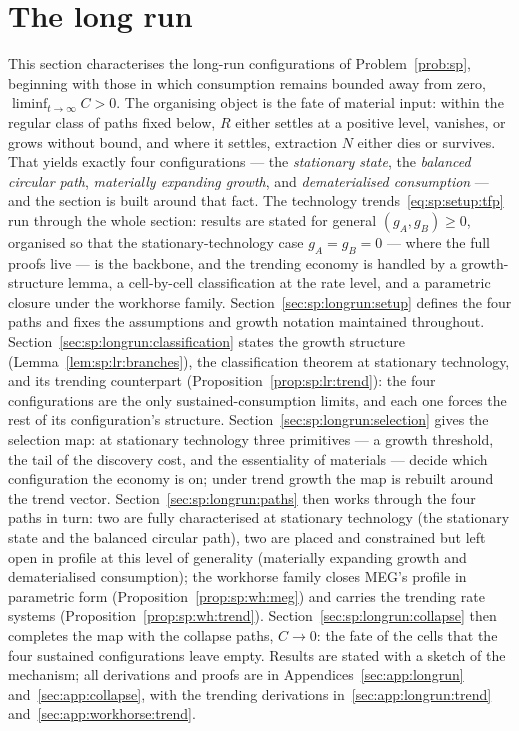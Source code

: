 \section{The long run}\label{sec:sp:longrun}

This section characterises the long-run configurations of Problem~\ref{prob:sp}, beginning
with those in which consumption remains bounded away from zero,
$\liminf_{t\to\infty}C>0$. The organising object is
the fate of material input: within the regular class of paths fixed below, $R$ either settles at
a positive level, vanishes, or grows without bound, and where it settles, extraction $N$ either
dies or survives. That yields exactly four configurations --- the \emph{stationary state}, the
\emph{balanced circular path}, \emph{materially expanding growth}, and \emph{dematerialised
consumption} --- and the section is built around that fact. The technology
trends~\eqref{eq:sp:setup:tfp} run through the whole section: results are stated for general
$\left(g_A,g_B\right)\ge0$, organised so that the stationary-technology case $g_A=g_B=0$ ---
where the full proofs live --- is the backbone, and the trending economy is handled by a
growth-structure lemma, a cell-by-cell classification at the rate level, and a parametric
closure under the workhorse family.
Section~\ref{sec:sp:longrun:setup} defines the four paths and fixes the assumptions and growth
notation maintained throughout. Section~\ref{sec:sp:longrun:classification} states the growth
structure (Lemma~\ref{lem:sp:lr:branches}), the classification theorem at stationary
technology, and its trending counterpart (Proposition~\ref{prop:sp:lr:trend}): the four
configurations are the only sustained-consumption limits, and each one forces the rest of its
configuration's structure.
Section~\ref{sec:sp:longrun:selection} gives the selection map: at stationary technology three
primitives --- a growth threshold, the tail of the discovery cost, and the essentiality of
materials --- decide which configuration the economy is on; under trend growth the map is
rebuilt around the trend vector. Section~\ref{sec:sp:longrun:paths} then works through the four
paths in turn: two are fully characterised at stationary technology (the stationary state and
the balanced circular path), two are placed and constrained but left open in profile at this
level of generality (materially expanding growth and dematerialised consumption); the
workhorse family closes MEG's profile in parametric form (Proposition~\ref{prop:sp:wh:meg})
and carries the trending rate systems (Proposition~\ref{prop:sp:wh:trend}).
Section~\ref{sec:sp:longrun:collapse} then completes the map with the collapse paths,
$C\to0$: the fate of the cells that the four sustained configurations leave empty. Results
are stated with a sketch of the mechanism; all derivations and proofs are in
Appendices~\ref{sec:app:longrun} and~\ref{sec:app:collapse}, with the trending derivations
in~\ref{sec:app:longrun:trend} and~\ref{sec:app:workhorse:trend}.

